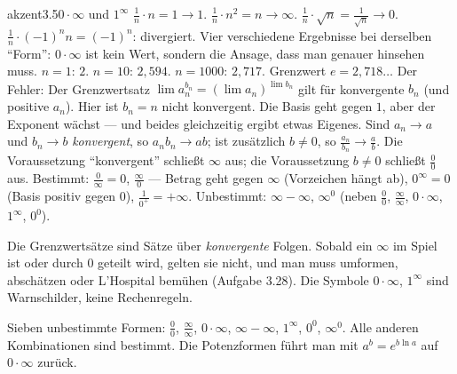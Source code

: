 \begin{loesungkarte}{akzent}{3.5}{$0\cdot\infty$ und $1^{\infty}$}
$\frac1n\cdot n = 1\to1$. $\frac1n\cdot n^{2} = n\to\infty$. $\frac1n\cdot\sqrt n = \frac1{\sqrt n}\to0$. $\frac1n\cdot(-1)^{n}n = (-1)^{n}$: divergiert. Vier verschiedene Ergebnisse bei derselben \enquote{Form}: $0\cdot\infty$ ist kein Wert, sondern die Ansage, dass man genauer hinsehen muss.
$n = 1$: $2$. $n = 10$: $2{,}594$. $n = 1000$: $2{,}717$. Grenzwert $e = 2{,}718\dots$ Der Fehler: Der Grenzwertsatz $\lim a_n^{b_n} = (\lim a_n)^{\lim b_n}$ gilt für konvergente $b_n$ (und positive $a_n$). Hier ist $b_n = n$ nicht konvergent. Die Basis geht gegen $1$, aber der Exponent wächst --- und beides gleichzeitig ergibt etwas Eigenes.
Sind $a_n\to a$ und $b_n\to b$ \emph{konvergent}, so $a_nb_n\to ab$; ist zusätzlich $b\neq0$, so $\frac{a_n}{b_n}\to\frac ab$. Die Voraussetzung \enquote{konvergent} schließt $\infty$ aus; die Voraussetzung $b\neq0$ schließt $\frac00$ aus.
Bestimmt: $\frac0\infty = 0$, $\frac\infty0$ --- Betrag geht gegen $\infty$ (Vorzeichen hängt ab), $0^{\infty} = 0$ (Basis positiv gegen $0$), $\frac1{0^{+}} = +\infty$. Unbestimmt: $\infty - \infty$, $\infty^{0}$ (neben $\frac00$, $\frac\infty\infty$, $0\cdot\infty$, $1^{\infty}$, $0^{0}$).
\begin{fehler}\kastentext
Die Grenzwertsätze sind Sätze über \emph{konvergente} Folgen. Sobald ein $\infty$ im Spiel ist oder durch $0$ geteilt wird, gelten sie nicht, und man muss umformen, abschätzen oder L'Hospital bemühen (Aufgabe 3.28). Die Symbole $0\cdot\infty$, $1^{\infty}$ sind Warnschilder, keine Rechenregeln.
\end{fehler}
\begin{mitnehmen}\kastentext
Sieben unbestimmte Formen: $\frac00$, $\frac\infty\infty$, $0\cdot\infty$, $\infty - \infty$, $1^{\infty}$, $0^{0}$, $\infty^{0}$. Alle anderen Kombinationen sind bestimmt. Die Potenzformen führt man mit $a^{b} = e^{b\ln a}$ auf $0\cdot\infty$ zurück.
\end{mitnehmen}
\end{loesungkarte}

